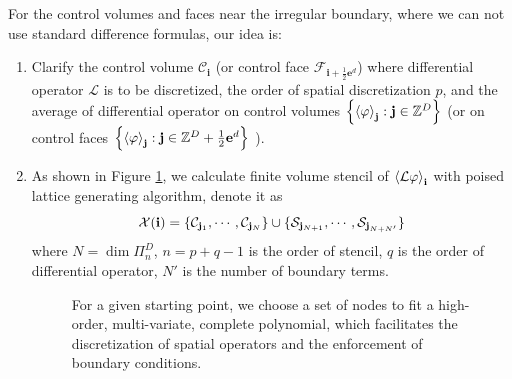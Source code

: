 For the control volumes and faces near the irregular boundary, where
we can not use standard difference formulas, our idea is:
\begin{enumerate}
\item Clarify the control volume $\mathcal{C}_{\mathbf{i}}$ (or
  control face $\mathcal{F}_{\mathbf{i}+\frac{1}{2}\mathbf{e}^d}$)
  where differential operator $\mathcal{L}$ is to be discretized, the order of
  spatial discretization $p$, and the average of differential
  operator on control volumes 
  $\left\{\left<\varphi\right>_{{\mathbf{j}}}:{\mathbf{j}}\in\mathbb{Z}^D\right\}$ (or
  on control faces
  $\left\{\left<\varphi\right>_{{\mathbf{j}}}:{\mathbf{j}}\in\mathbb{Z}^D+\frac{1}{2}{\mathbf{e}}^d\right\}$
  ).
\item As shown in Figure \ref{fig:PLGfigure}, we calculate finite volume stencil of
  $\left<\mathcal{L}\varphi\right>_{{\mathbf{i}}}$ with poised lattice
  generating algorithm, denote it as
  \begin{equation}
    \label{eq:Stencil}
    \mathcal{X}({\mathbf{i}}) =
    \{\mathcal{C}_{{\mathbf{j}}_1},\cdots,\mathcal{C}_{{\mathbf{j}}_N}\} \cup
    \{\mathcal{S}_{{\mathbf{j}}_{N+1}},\cdots,\mathcal{S}_{{\mathbf{j}}_{N+N'}}\}
  \end{equation}
  where $N=\dim\Pi_n^D$, $n=p+q-1$ is the order of stencil, $q$ is the
  order of differential operator, $N'$ is the number of boundary
  terms.

   \begin{figure}[htbp]
  \centering
  \hspace{2cm}
  
  \caption{For a given starting point, we choose a set of nodes to fit
  a high-order, multi-variate, complete polynomial, which facilitates
  the discretization of spatial operators and the enforcement of
  boundary conditions.}
  \label{fig:PLGfigure}
\end{figure}


\end{enumerate}
